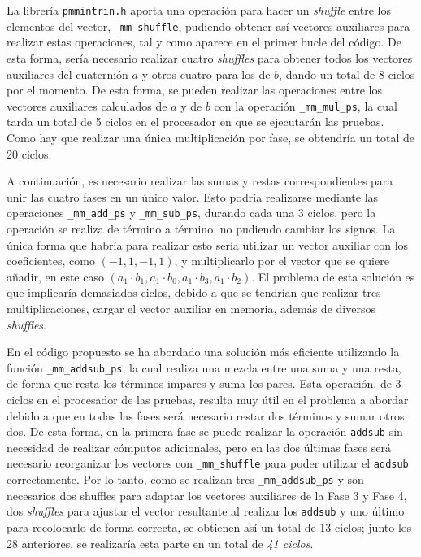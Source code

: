 \documentclass[conference]{IEEEtran}
\begin{document}
La librería \texttt{pmmintrin.h} aporta una operación para hacer un \textit{shuffle} entre los elementos del vector, \texttt{\_mm\_shuffle}, pudiendo obtener así vectores auxiliares para realizar estas operaciones, tal y como aparece en el primer bucle del código. De esta forma, sería necesario realizar cuatro \textit{shuffles} para obtener todos los vectores auxiliares del cuaternión $a$ y otros cuatro para los de $b$, dando un total de 8 ciclos por el momento. De esta forma, se pueden realizar las operaciones entre los vectores auxiliares calculados de $a$ y de $b$ con la operación \texttt{\_mm\_mul\_ps}, la cual tarda un total de 5 ciclos en el procesador en que se ejecutarán las pruebas. Como hay que realizar una única multiplicación por fase, se obtendría un total de 20 ciclos.

A continuación, es necesario realizar las sumas y restas correspondientes para unir las cuatro fases en un único valor. Esto podría realizarse mediante las operaciones \texttt{\_mm\_add\_ps} y \texttt{\_mm\_sub\_ps}, durando cada una 3 ciclos, pero la operación se realiza de término a término, no pudiendo cambiar los signos. La única forma que habría para realizar esto sería utilizar un vector auxiliar con los coeficientes, como $(-1, 1, -1, 1)$, y multiplicarlo por el vector que se quiere añadir, en este caso $(a_{1}\cdot b_{1}, a_{1}\cdot b_{0}, a_{1}\cdot b_{3}, a_{1}\cdot b_{2})$. El problema de esta solución es que implicaría demasiados ciclos, debido a que se tendrían que realizar tres multiplicaciones, cargar el vector auxiliar en memoria, además de diversos \textit{shuffles}.

En el código propuesto se ha abordado una solución más eficiente utilizando la función \texttt{\_mm\_addsub\_ps}, la cual realiza una mezcla entre una suma y una resta, de forma que resta los términos impares y suma los pares. Esta operación, de 3 ciclos en el procesador de las pruebas, resulta muy útil en el problema a abordar debido a que en todas las fases será necesario restar dos términos y sumar otros dos. De esta forma, en la primera fase se puede realizar la operación \texttt{addsub} sin necesidad de realizar cómputos adicionales, pero en las dos últimas fases será necesario reorganizar los vectores con \texttt{\_mm\_shuffle} para poder utilizar el \texttt{addsub} correctamente. Por lo tanto, como se realizan tres \texttt{\_mm\_addsub\_ps} y son necesarios dos shuffles para adaptar los vectores auxiliares de la Fase 3 y Fase 4, dos \textit{shuffles} para ajustar el vector resultante al realizar los \texttt{addsub} y uno último para recolocarlo de forma correcta, se obtienen así un total de 13 ciclos; junto los 28 anteriores, se realizaría esta parte en un total de \textit{41 ciclos}.
\end{document}
